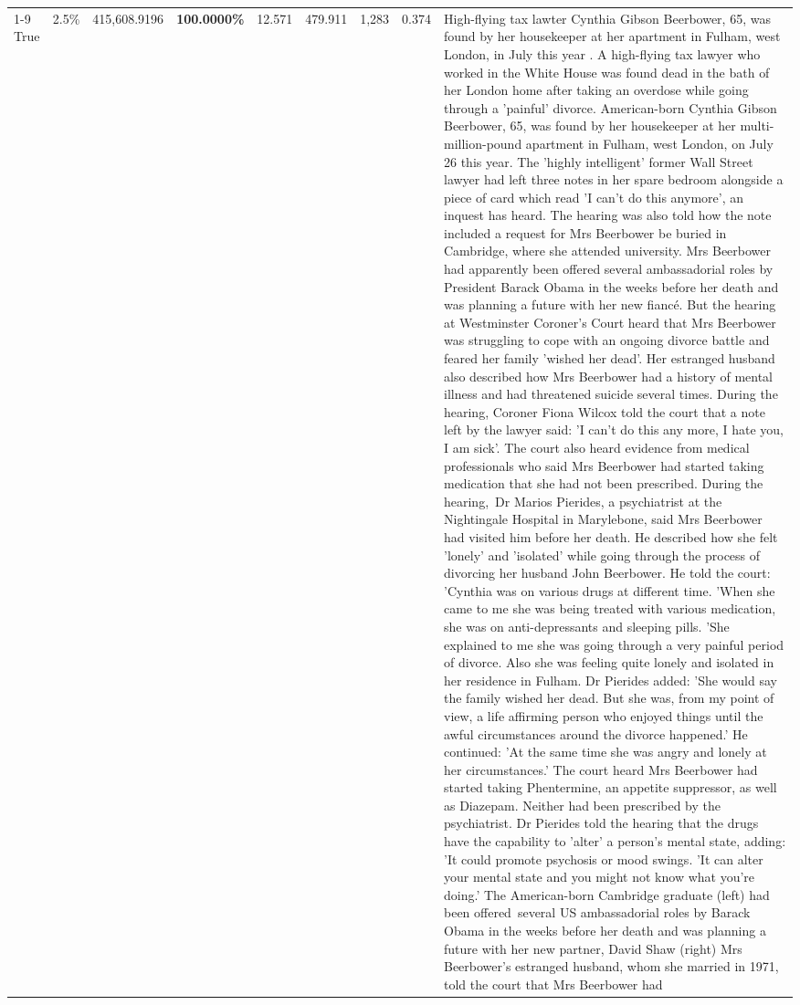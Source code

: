 \begin{table}[H]
\begin{tabular}{lllrlllll}
 \\
\cline{1-9}
True & 2.5\% & 415,608.9196 & \bfseries \color{red} 100.0000\% & 12.571 & 479.911 & 1,283 & 0.374 & High-flying tax lawter Cynthia Gibson Beerbower, 65, was found by her housekeeper at her apartment in Fulham, west London, in July this year . A high-flying tax lawyer who worked in the White House was found dead in the bath of her London home after taking an overdose while going through a 'painful' divorce. American-born Cynthia Gibson Beerbower, 65, was found by her housekeeper at her multi-million-pound apartment in Fulham, west London, on July 26 this year. The 'highly intelligent' former Wall Street lawyer had left three notes in her spare bedroom alongside a piece of card which read 'I can't do this anymore', an inquest has heard. The hearing was also told how the note included a request for Mrs Beerbower be buried in Cambridge, where she attended university. Mrs Beerbower had apparently been offered several ambassadorial roles by President Barack Obama in the weeks before her death and was planning a future with her new fiancé. But the hearing at Westminster Coroner's Court heard that Mrs Beerbower was struggling to cope with an ongoing divorce battle and feared her family 'wished her dead'. Her estranged husband also described how Mrs Beerbower had a history of mental illness and had threatened suicide several times. During the hearing, Coroner Fiona Wilcox told the court that a note left by the lawyer said: 'I can't do this any more, I hate you, I am sick'. The court also heard evidence from medical professionals who said Mrs Beerbower had started taking medication that she had not been prescribed. During the hearing, Dr Marios Pierides, a psychiatrist at the Nightingale Hospital in Marylebone, said Mrs Beerbower had visited him before her death. He described how she felt 'lonely' and 'isolated' while going through the process of divorcing her husband John Beerbower. He told the court: 'Cynthia was on various drugs at different time. 'When she came to me she was being treated with various medication, she was on anti-depressants and sleeping pills. 'She explained to me she was going through a very painful period of divorce. Also she was feeling quite lonely and isolated in her residence in Fulham. Dr Pierides added: 'She would say the family wished her dead. But she was, from my point of view, a life affirming person who enjoyed things until the awful circumstances around the divorce happened.' He continued: 'At the same time she was angry and lonely at her circumstances.' The court heard Mrs Beerbower had started taking Phentermine, an appetite suppressor, as well as Diazepam. Neither had been prescribed by the psychiatrist. Dr Pierides told the hearing that the drugs have the capability to 'alter' a person's mental state, adding: 'It could promote psychosis or mood swings. 'It can alter your mental state and you might not know what you're doing.' The American-born Cambridge graduate (left) had been offered several US ambassadorial roles by Barack Obama in the weeks before her death and was planning a future with her new partner, David Shaw (right) Mrs Beerbower's estranged husband, whom she married in 1971, told the court that Mrs Beerbower had 
\end{tabular}
\end{table}
